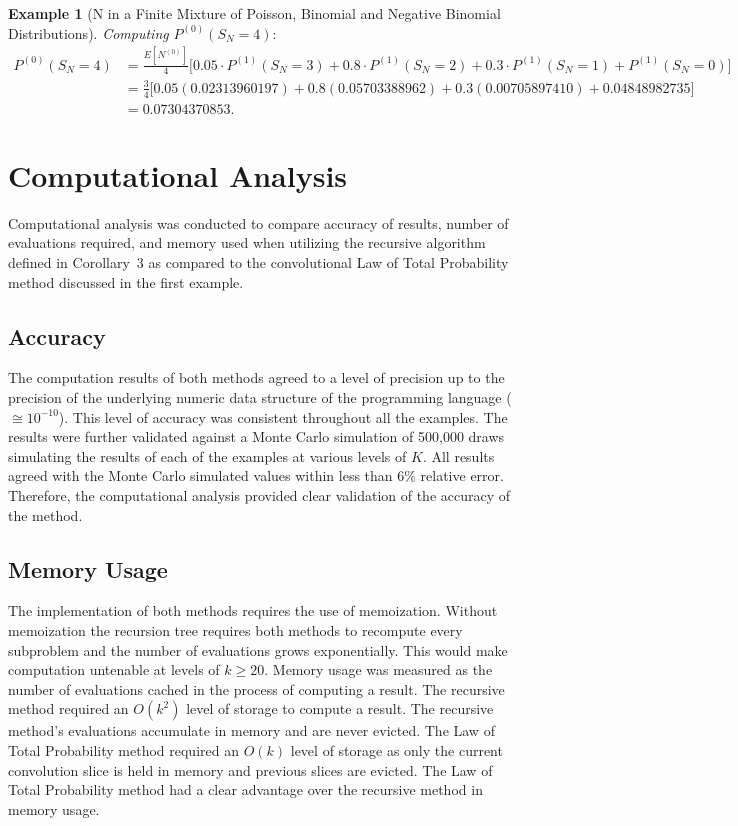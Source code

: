 \documentclass[11pt]{amsart}
\theoremstyle{definition}
\newtheorem{example}{Example}
\theoremstyle{plain}
\begin{document}
\begin{example}[N in a Finite Mixture of Poisson, Binomial and Negative Binomial
Distributions]
\noindent\textit{Computing} $P^{(0)}(S_N = 4)$:
\begin{align*}
P^{(0)}(S_N = 4)
    &= \frac{E[N^{(0)}]}{4}
       \bigl[0.05 \cdot P^{(1)}(S_N = 3) + 0.8 \cdot P^{(1)}(S_N = 2)
       + 0.3 \cdot P^{(1)}(S_N = 1) + P^{(1)}(S_N = 0)\bigr] \\
    &= \frac{3}{4}
       \bigl[0.05(0.02313960197) + 0.8(0.05703388962)
       + 0.3(0.00705897410) + 0.04848982735\bigr] \\
    &= \boxed{0.07304370853}.
\end{align*}
\end{example}

\newpage
\section{Computational Analysis}

Computational analysis was conducted to compare accuracy of results, number of
evaluations required, and memory used when utilizing the recursive algorithm defined in
Corollary~3 as compared to the convolutional Law of Total Probability method discussed in
the first example.

\subsection{Accuracy}

The computation results of both methods agreed to a level of precision up to the precision
of the underlying numeric data structure of the programming language ($\cong 10^{-10}$).
This level of accuracy was consistent throughout all the examples. The results were further
validated against a Monte Carlo simulation of 500,000 draws simulating the results of each
of the examples at various levels of $K$. All results agreed with the Monte Carlo simulated
values within less than 6\% relative error. Therefore, the computational analysis provided
clear validation of the accuracy of the method.

\subsection{Memory Usage}

The implementation of both methods requires the use of memoization. Without memoization
the recursion tree requires both methods to recompute every subproblem and the number of
evaluations grows exponentially. This would make computation untenable at levels of
$k \geq 20$. Memory usage was measured as the number of evaluations cached in the process
of computing a result. The recursive method required an $O(k^2)$ level of storage to
compute a result. The recursive method's evaluations accumulate in memory and are never
evicted. The Law of Total Probability method required an $O(k)$ level of storage as only
the current convolution slice is held in memory and previous slices are evicted. The Law
of Total Probability method had a clear advantage over the recursive method in memory
usage.
\end{document}
